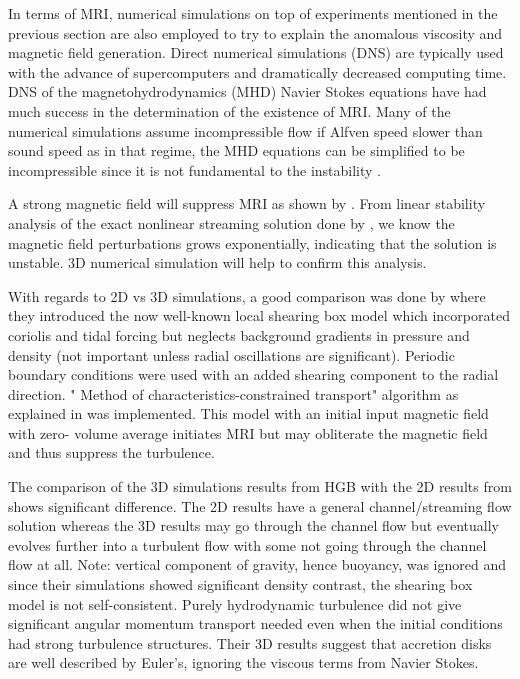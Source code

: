 \documentclass{jfm}
\begin{document}
In terms of MRI, numerical simulations on top of experiments mentioned in the 
previous section are also employed to try to explain the anomalous viscosity 
and magnetic field generation. Direct numerical simulations (DNS) are typically
used with the advance of supercomputers and dramatically decreased computing 
time. DNS of the magnetohydrodynamics (MHD) Navier Stokes equations have had 
much success in the determination of the existence of MRI. Many of the numerical
simulations assume incompressible flow if Alfven speed slower than sound speed
as in that regime, the MHD equations can be simplified to be incompressible 
since it is not fundamental to the instability \cite{Balbus1991}. 

A strong magnetic field will suppress MRI as shown by \cite{Liu2008}. From
linear stability analysis of the exact nonlinear streaming solution done by
\cite{Goodman1994}, we know the magnetic field perturbations grows
exponentially, indicating that the solution is unstable. 3D numerical
simulation will help to confirm this analysis.

With regards to 2D vs 3D simulations, a good comparison was done by
\cite{Hawley1995} where they introduced the now well-known local shearing box
model which incorporated coriolis and tidal forcing but neglects background
gradients in pressure and density (not important unless radial oscillations are
significant). Periodic boundary conditions were used with an added shearing
component to the radial direction. " Method of characteristics-constrained
transport" algorithm as explained in \cite{Hawley1995} was implemented. This
model with an initial input magnetic field with zero- volume average initiates
MRI but may obliterate the magnetic field and thus suppress the turbulence. 

The comparison of the 3D simulations results from HGB with the 2D results from
\cite{Balbus1994} shows significant difference. The 2D results have a general
channel/streaming flow solution whereas the 3D results may go through the
channel flow but eventually evolves further into a turbulent flow with some not
going through the channel flow at all. Note: vertical component of gravity,
hence buoyancy, was ignored and since their simulations showed significant
density contrast, the shearing box model is not self-consistent. Purely
hydrodynamic turbulence did not give significant angular momentum transport
needed even when the initial conditions had strong turbulence structures. Their
3D results suggest that accretion disks are well described by Euler's, ignoring
the viscous terms from Navier Stokes.
\end{document}
